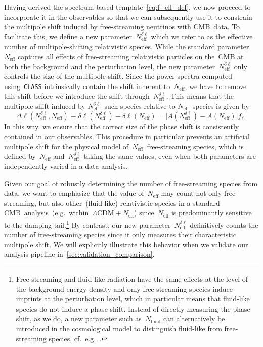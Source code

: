 \documentclass[11pt]{article}
\numberwithin{equation}{section}
\newcommand{\Neff}{N_\mathrm{eff}}
\newcommand{\Nmultipole}{N_\mathrm{eff}^{\delta\ell}}
\begin{document}
Having derived the spectrum-based template~\eqref{eq:f_ell_def}, we now proceed to incorporate it in the observables so that we can subsequently use it to constrain the multipole shift induced by free-streaming neutrinos with CMB~data. To facilitate this, we define a new parameter~$\Nmultipole$ which we refer to as the effective number of multipole-shifting relativistic species. While the standard parameter~$\Neff$ captures all effects of free-streaming relativistic particles on the~CMB at both the background and the perturbation level, the new parameter~$\Nmultipole$ only controls the size of the multipole shift. Since the power spectra computed using~\texttt{CLASS} intrinsically contain the shift inherent to~$\Neff$, we have to remove this shift before we introduce the shift through~$\Nmultipole$. This means that the multipole shift induced by $\Nmultipole$~such species relative to $\Neff$~species is given by
\begin{equation}
	\Delta\ell(\Nmultipole, \Neff) \equiv \delta\ell(\Nmultipole) - \delta\ell(\Neff) = \bigl[A(\Nmultipole) - A(\Neff)\bigr] f_\ell\, .	\label{eq:deltaellnu}
\end{equation}
In this way, we ensure that the correct size of the phase shift is consistently contained in our observables. This procedure in particular prevents an artificial multipole shift for the physical model of~$\Neff$~free-streaming species, which is defined by~$\Neff$ and~$\Nmultipole$ taking the same values, even when both parameters are independently varied in a data analysis.

Given our goal of robustly determining the number of free-streaming species from data, we want to emphasize that the value of~$\Neff$ may count not only free-streaming, but also other~(fluid-like) relativistic species in a standard CMB~analysis~(e.g.\ within~$\Lambda\mathrm{CDM} + \Neff$) since~$\Neff$ is predominantly sensitive to the damping tail.\footnote{Free-streaming and fluid-like radiation have the same effects at the level of the background energy density and only free-streaming species induce imprints at the perturbation level, which in particular means that fluid-like species do not induce a phase shift. Instead of directly measuring the phase shift, as we do, a new parameter such as~$N_\mathrm{fluid}$ can alternatively be introduced in the cosmological model to distinguish fluid-like from free-streaming species, cf.~e.g.~\cite{Bell:2005dr, Friedland:2007vv, Baumann:2015rya, Brust:2017nmv, Blinov:2020hmc, Brinckmann:2020bcn, Brinckmann:2022ajr}.} By contrast, our new parameter~$\Nmultipole$ definitively counts the number of free-streaming species since it only measures their characteristic multipole shift. We will explicitly illustrate this behavior when we validate our analysis pipeline in~\textsection\ref{sec:validation_comparison}.\medskip
\end{document}
